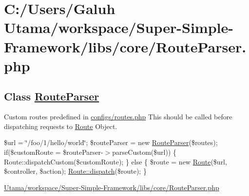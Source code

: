 \hypertarget{_c_1_2_users_2_galuh_01_utama_2workspace_2_super-_simple-_framework_2libs_2core_2_route_parser_8php-example}{\section{\-C\-:/\-Users/\-Galuh Utama/workspace/\-Super-\/\-Simple-\/\-Framework/libs/core/\-Route\-Parser.\-php}
}
\subsection*{\-Class \hyperlink{class_route_parser}{\-Route\-Parser}}

\-Custom routes predefined in \hyperlink{routes_8php_source}{configs/routes.\-php} \-This should be called before dispatching requests to \hyperlink{class_route}{\-Route} \-Object. 

\$url = \char`\"{}/foo/1/hello/world\char`\"{}; \$route\-Parser = new \hyperlink{class_route_parser}{\-Route\-Parser}(\$routes); if(\$custom\-Route = \$route\-Parser-\/$>$parse\-Custom(\$url)) \{ \-Route\-::dispatch\-Custom(\$custom\-Route); \} else \{ \$route = new \hyperlink{class_route}{\-Route}(\$url, \$controller, \$action); \hyperlink{class_route_ad563c937ff9e2e8ebc7f4501662c389d}{\-Route\-::dispatch}(\$route); \}


\begin{DoxyCodeInclude}
\end{DoxyCodeInclude}
 \hyperlink{_route_parser_8php_source}{\-Utama/workspace/\-Super-\/\-Simple-\/\-Framework/libs/core/\-Route\-Parser.\-php} 